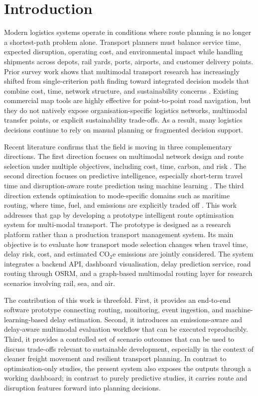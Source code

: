 \section{Introduction}
Modern logistics systems operate in conditions where route planning is no longer a shortest-path problem alone. Transport planners must balance service time, expected disruption, operating cost, and environmental impact while handling shipments across depots, rail yards, ports, airports, and customer delivery points. Prior survey work shows that multimodal transport research has increasingly shifted from single-criterion path finding toward integrated decision models that combine cost, time, network structure, and sustainability concerns \cite{matei2021}. Existing commercial map tools are highly effective for point-to-point road navigation, but they do not natively expose organisation-specific logistics networks, multimodal transfer points, or explicit sustainability trade-offs. As a result, many logistics decisions continue to rely on manual planning or fragmented decision support.

Recent literature confirms that the field is moving in three complementary directions. The first direction focuses on multimodal network design and route selection under multiple objectives, including cost, time, carbon, and risk \cite{ghaderi2015, shang2021, maneengam2023, liwang2023, koohathongsumrit2024}. The second direction focuses on predictive intelligence, especially short-term travel time and disruption-aware route prediction using machine learning \cite{qiu2021, prakash2024}. The third direction extends optimisation to mode-specific domains such as maritime routing, where time, fuel, and emissions are explicitly traded off \cite{zhao2024}. This work addresses that gap by developing a prototype intelligent route optimisation system for multi-modal transport. The prototype is designed as a research platform rather than a production transport management system. Its main objective is to evaluate how transport mode selection changes when travel time, delay risk, cost, and estimated \(\mathrm{CO_2e}\) emissions are jointly considered. The system integrates a backend API, dashboard visualisation, delay prediction service, road routing through OSRM, and a graph-based multimodal routing layer for research scenarios involving rail, sea, and air.

The contribution of this work is threefold. First, it provides an end-to-end software prototype connecting routing, monitoring, event ingestion, and machine-learning-based delay estimation. Second, it introduces an emissions-aware and delay-aware multimodal evaluation workflow that can be executed reproducibly. Third, it provides a controlled set of scenario outcomes that can be used to discuss trade-offs relevant to sustainable development, especially in the context of cleaner freight movement and resilient transport planning. In contrast to optimisation-only studies, the present system also exposes the outputs through a working dashboard; in contrast to purely predictive studies, it carries route and disruption features forward into planning decisions.

